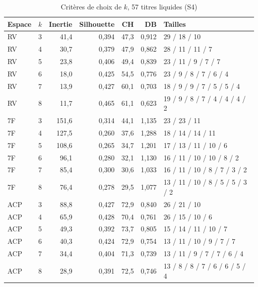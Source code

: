 \begin{table}[H]\centering\small
\caption{Critères de choix de $k$, 57 titres liquides (S4)}\label{tab:annexe-k57}
\begin{tabular}{llrrrrl}\toprule
Espace & $k$ & Inertie & Silhouette & CH & DB & Tailles \\ \midrule
RV & 3 & 41{,}4 & 0{,}394 & 47{,}3 & 0{,}912 & 29 / 18 / 10 \\
RV & 4 & 30{,}7 & 0{,}379 & 47{,}9 & 0{,}862 & 28 / 11 / 11 / 7 \\
RV & 5 & 23{,}8 & 0{,}406 & 49{,}4 & 0{,}839 & 23 / 11 / 9 / 7 / 7 \\
RV & 6 & 18{,}0 & 0{,}425 & 54{,}5 & 0{,}776 & 23 / 9 / 8 / 7 / 6 / 4 \\
RV & 7 & 13{,}9 & 0{,}427 & 60{,}1 & 0{,}703 & 18 / 9 / 9 / 7 / 5 / 5 / 4 \\
RV & 8 & 11{,}7 & 0{,}465 & 61{,}1 & 0{,}623 & 19 / 9 / 8 / 7 / 4 / 4 / 4 / 2 \\
\midrule
7F & 3 & 151{,}6 & 0{,}314 & 44{,}1 & 1{,}135 & 23 / 23 / 11 \\
7F & 4 & 127{,}5 & 0{,}260 & 37{,}6 & 1{,}288 & 18 / 14 / 14 / 11 \\
7F & 5 & 108{,}6 & 0{,}265 & 34{,}7 & 1{,}201 & 17 / 13 / 11 / 10 / 6 \\
7F & 6 & 96{,}1 & 0{,}280 & 32{,}1 & 1{,}130 & 16 / 11 / 10 / 10 / 8 / 2 \\
7F & 7 & 85{,}4 & 0{,}300 & 30{,}6 & 1{,}033 & 16 / 11 / 10 / 8 / 7 / 3 / 2 \\
7F & 8 & 76{,}4 & 0{,}278 & 29{,}5 & 1{,}077 & 13 / 11 / 10 / 8 / 5 / 5 / 3 / 2 \\
\midrule
ACP & 3 & 88{,}8 & 0{,}427 & 72{,}9 & 0{,}840 & 26 / 21 / 10 \\
ACP & 4 & 65{,}9 & 0{,}428 & 70{,}4 & 0{,}761 & 26 / 15 / 10 / 6 \\
ACP & 5 & 49{,}3 & 0{,}392 & 73{,}7 & 0{,}805 & 15 / 14 / 11 / 10 / 7 \\
ACP & 6 & 40{,}3 & 0{,}424 & 72{,}9 & 0{,}754 & 13 / 11 / 10 / 9 / 7 / 7 \\
ACP & 7 & 34{,}4 & 0{,}404 & 71{,}3 & 0{,}739 & 13 / 11 / 9 / 7 / 7 / 6 / 4 \\
ACP & 8 & 28{,}9 & 0{,}391 & 72{,}5 & 0{,}746 & 13 / 8 / 8 / 7 / 6 / 6 / 5 / 4 \\
\bottomrule\end{tabular}\end{table}
